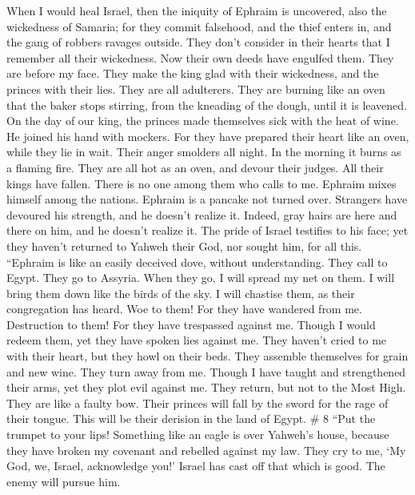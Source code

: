  When I would heal Israel, then the iniquity of Ephraim is
uncovered, also the wickedness of Samaria; for they commit falsehood,
and the thief enters in, and the gang of robbers ravages outside.
 They don't consider in their hearts that I remember all
their wickedness. Now their own deeds have engulfed them. They are
before my face.  They make the king glad with their
wickedness, and the princes with their lies.  They are all
adulterers. They are burning like an oven that the baker stops stirring,
from the kneading of the dough, until it is leavened.  On
the day of our king, the princes made themselves sick with the heat of
wine. He joined his hand with mockers.  For they have
prepared their heart like an oven, while they lie in wait. Their anger
smolders all night. In the morning it burns as a flaming fire.
 They are all hot as an oven, and devour their judges. All
their kings have fallen. There is no one among them who calls to me.
 Ephraim mixes himself among the nations. Ephraim is a
pancake not turned over.  Strangers have devoured his
strength, and he doesn't realize it. Indeed, gray hairs are here and
there on him, and he doesn't realize it.  The pride of
Israel testifies to his face; yet they haven't returned to Yahweh their
God, nor sought him, for all this.  ``Ephraim is like an
easily deceived dove, without understanding. They call to Egypt. They go
to Assyria.  When they go, I will spread my net on them. I
will bring them down like the birds of the sky. I will chastise them, as
their congregation has heard.  Woe to them! For they have
wandered from me. Destruction to them! For they have trespassed against
me. Though I would redeem them, yet they have spoken lies against me.
 They haven't cried to me with their heart, but they howl
on their beds. They assemble themselves for grain and new wine. They
turn away from me.  Though I have taught and strengthened
their arms, yet they plot evil against me.  They return,
but not to the Most High. They are like a faulty bow. Their princes will
fall by the sword for the rage of their tongue. This will be their
derision in the land of Egypt. \# 8  ``Put the trumpet to
your lips! Something like an eagle is over Yahweh's house, because they
have broken my covenant and rebelled against my law.  They
cry to me, `My God, we, Israel, acknowledge you!'  Israel
has cast off that which is good. The enemy will pursue him. 
